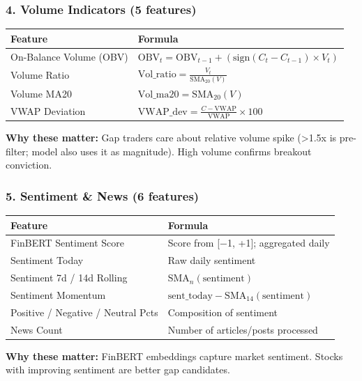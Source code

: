 \documentclass[11pt,a4paper]{article}
\begin{document}
\subsubsection{4. Volume Indicators (5 features)}

\begin{table}[h]
\centering
\begin{tabular}{ll}
\toprule
\textbf{Feature} & \textbf{Formula} \\
\midrule
On-Balance Volume (OBV) & $\text{OBV}_t = \text{OBV}_{t-1} + (\text{sign}(C_t - C_{t-1}) \times V_t)$ \\
Volume Ratio & $\text{Vol\_ratio} = \frac{V_t}{\text{SMA}_{20}(V)}$ \\
Volume MA20 & $\text{Vol\_ma20} = \text{SMA}_{20}(V)$ \\
VWAP Deviation & $\text{VWAP\_dev} = \frac{C - \text{VWAP}}{\text{VWAP}} \times 100$ \\
\bottomrule
\end{tabular}
\end{table}

\textbf{Why these matter:} Gap traders care about relative volume spike (>1.5x is pre-filter; model also uses it as magnitude). High volume confirms breakout conviction.

\subsubsection{5. Sentiment & News (6 features)}

\begin{table}[h]
\centering
\begin{tabular}{ll}
\toprule
\textbf{Feature} & \textbf{Formula} \\
\midrule
FinBERT Sentiment Score & Score from [−1, +1]; aggregated daily \\
Sentiment Today & Raw daily sentiment \\
Sentiment 7d / 14d Rolling & $\text{SMA}_n(\text{sentiment})$ \\
Sentiment Momentum & $\text{sent\_today} - \text{SMA}_{14}(\text{sentiment})$ \\
Positive / Negative / Neutral Pcts & Composition of sentiment \\
News Count & Number of articles/posts processed \\
\bottomrule
\end{tabular}
\end{table}

\textbf{Why these matter:} FinBERT embeddings capture market sentiment. Stocks with improving sentiment are better gap candidates.
\end{document}
